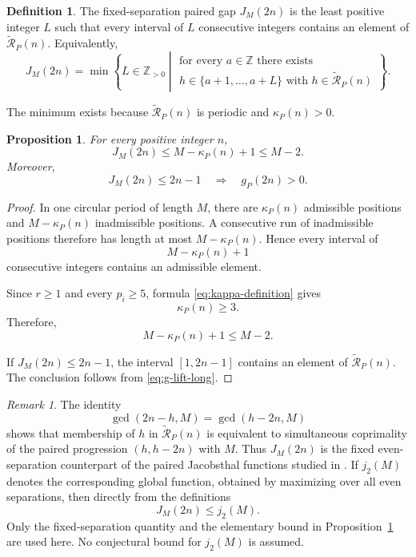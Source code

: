 \documentclass[12pt]{article}
\numberwithin{equation}{section}
\newtheorem{proposition}[theorem]{Proposition}
\theoremstyle{definition}
\newtheorem{definition}[theorem]{Definition}
\theoremstyle{remark}
\newtheorem{remark}[theorem]{Remark}
\newcommand{\Z}{\mathbb Z}
\newcommand{\Rcal}{\mathcal R}
\begin{document}
\begin{definition}
\label{def:paired-gap}
The fixed-separation paired gap $J_M(2n)$ is the least positive
integer $L$ such that every interval of $L$ consecutive
integers contains an element of
$\widetilde{\Rcal}_P(n)$. Equivalently,
\begin{equation}
\label{eq:J-definition}
J_M(2n)
=
\min
\left\{
L\in\Z_{>0}
\mathrel{}\middle|\mathrel{}
\begin{array}{c}
\text{for every }a\in\Z\text{ there exists}\\
h\in\{a+1,\dots,a+L\}
\text{ with }h\in\widetilde{\Rcal}_P(n)
\end{array}
\right\}.
\end{equation}
\end{definition}

The minimum exists because
$\widetilde{\Rcal}_P(n)$ is periodic and
$\kappa_P(n)>0$.

\begin{proposition}
\label{prop:J-bound}
For every positive integer $n$,
\begin{equation}
\label{eq:J-bound}
J_M(2n)
\leq M-\kappa_P(n)+1
\leq M-2.
\end{equation}
Moreover,
\begin{equation}
\label{eq:J-positivity}
J_M(2n)\leq2n-1
\quad\Longrightarrow\quad
g_P(2n)>0.
\end{equation}
\end{proposition}

\begin{proof}
In one circular period of length $M$, there are
$\kappa_P(n)$ admissible positions and
$M-\kappa_P(n)$ inadmissible positions. A consecutive run of
inadmissible positions therefore has length at most
$M-\kappa_P(n)$. Hence every interval of
\[
M-\kappa_P(n)+1
\]
consecutive integers contains an admissible element.

Since $r\geq1$ and every $p_i\geq5$, formula
\eqref{eq:kappa-definition} gives
\[
\kappa_P(n)\geq3.
\]
Therefore,
\[
M-\kappa_P(n)+1\leq M-2.
\]

If $J_M(2n)\leq2n-1$, the interval $[1,2n-1]$ contains an
element of $\widetilde{\Rcal}_P(n)$. The conclusion follows
from \eqref{eq:g-lift-long}.
\end{proof}

\begin{remark}
The identity
\[
\gcd(2n-h,M)=\gcd(h-2n,M)
\]
shows that membership of $h$ in $\widetilde{\Rcal}_P(n)$ is
equivalent to simultaneous coprimality of the paired progression
$(h,h-2n)$ with $M$. Thus $J_M(2n)$ is the fixed even-separation
counterpart of the paired Jacobsthal functions studied in
\cite{ZillerMorack2017,ZillerMorack2017b}. If $j_2(M)$ denotes
the corresponding global function, obtained by maximizing over
all even separations, then directly from the definitions
\[
J_M(2n)\leq j_2(M).
\]
Only the fixed-separation quantity and the elementary bound in
Proposition~\ref{prop:J-bound} are used here. No conjectural
bound for $j_2(M)$ is assumed.
\end{remark}
\end{document}
